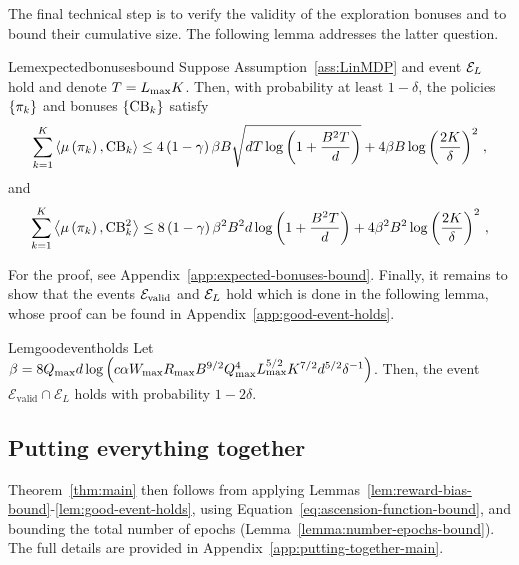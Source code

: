 The final technical step is to verify the validity of the exploration bonuses and to bound their cumulative size. The following lemma addresses the latter question.
%
\begin{restatable}{Lem}{expectedbonusesbound} \label{lem:expected-bonuses-bound}
    Suppose Assumption~\ref{ass:LinMDP} and event $\mathcal{E}_L$ hold and denote $T = L_{\max} K$. Then, with probability at least $1 - \delta$, the policies $\left\{ \pi_k \right\}$ and bonuses $\left\{ \operatorname{CB}_k \right\}$ satisfy
    \begin{equation*}
        \sum_{k=1}^K \left\langle \mu \left( \pi_k \right), \operatorname{CB}_k \right\rangle \leq 4 \left( 1 - \gamma \right) \beta B \sqrt{d T\log \left( 1 + \frac{B^2 T}{d} \right)} + 4 \beta B \log \left( \frac{2 K}{\delta} \right)^2\,,
    \end{equation*}
    and
    \begin{equation*}
        \sum_{k=1}^K \left\langle \mu \left( \pi_k \right), \operatorname{CB}_k^2 \right\rangle \leq 8 \left( 1 - \gamma \right) \beta^2 B^2 d \log \left( 1 + \frac{B^2 T}{d} \right) + 4 \beta^2 B^2 \log \left( \frac{2 K}{\delta} \right)^2\,,
    \end{equation*}
\end{restatable}
%
For the proof, see Appendix~\ref{app:expected-bonuses-bound}. Finally, it remains to show that the events $\mathcal{E}_{\text{valid}}$ and $\mathcal{E}_L$ hold which is done in the following lemma, whose proof can be found in Appendix~\ref{app:good-event-holds}.
%
\begin{restatable}{Lem}{goodeventholds} \label{lem:good-event-holds}
    Let $\beta = 8 Q_{\max} d \log \left( c \alpha W_{\max} R_{\max} B^{9/2} Q_{\max}^4 L_{\max}^{5/2} K^{7/2} d^{5/2} \delta^{-1} \right)$. Then, the event $\mathcal{E}_{\text{valid}} \cap \mathcal{E}_L$ holds with probability $1 - 2 \delta$.
\end{restatable}


\subsection{Putting everything together}

Theorem~\ref{thm:main} then follows from applying Lemmas~\ref{lem:reward-bias-bound}-\ref{lem:good-event-holds}, using Equation~\eqref{eq:ascension-function-bound}, and bounding the total number of epochs (Lemma~\ref{lemma:number-epochs-bound}). The full details are provided in Appendix~\ref{app:putting-together-main}.
